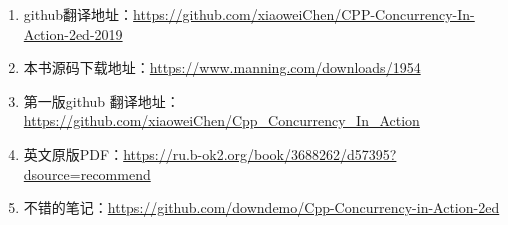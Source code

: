 
\begin{enumerate}
    \item github翻译地址：\url{https://github.com/xiaoweiChen/CPP-Concurrency-In-Action-2ed-2019}
    \item 本书源码下载地址：\url{https://www.manning.com/downloads/1954}
    \item 第一版github 翻译地址：\url{https://github.com/xiaoweiChen/Cpp_Concurrency_In_Action}
    \item 英文原版PDF：\url{https://ru.b-ok2.org/book/3688262/d57395?dsource=recommend}
    \item 不错的笔记：\url{https://github.com/downdemo/Cpp-Concurrency-in-Action-2ed}
\end{enumerate}

